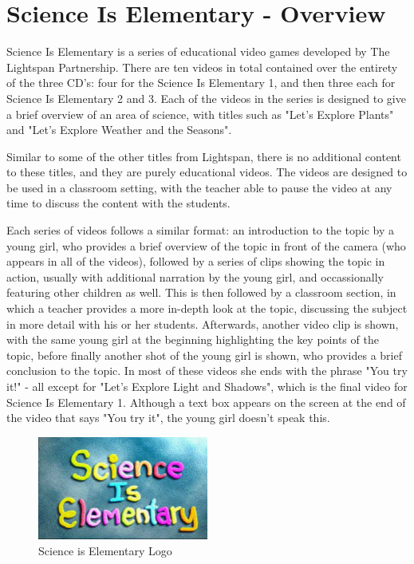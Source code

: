\chapter{Science Is Elementary - Overview}

Science Is Elementary is a series of educational video games developed by The Lightspan Partnership. There are ten videos in total contained over the entirety of the three CD's: four for the Science Is Elementary 1, and then three each for Science Is Elementary 2 and 3. Each of the videos in the series is designed to give a brief overview of an area of science, with titles such as "Let's Explore Plants" and "Let's Explore Weather and the Seasons".

Similar to some of the other titles from Lightspan, there is no additional content to these titles, and they are purely educational videos. The videos are designed to be used in a classroom setting, with the teacher able to pause the video at any time to discuss the content with the students.

Each series of videos follows a similar format: an introduction to the topic by a young girl, who provides a brief overview of the topic in front of the camera (who appears in all of the videos), followed by a series of clips showing the topic in action, usually with additional narration by the young girl, and occassionally featuring other children as well. This is then followed by a classroom section, in which a teacher provides a more in-depth look at the topic, discussing the subject in more detail with his or her students. Afterwards, another video clip is shown, with the same young girl at the beginning highlighting the key points of the topic, before finally another shot of the young girl is shown, who provides a brief conclusion to the topic. In most of these videos she ends with the phrase "You try it!" - all except for "Let's Explore Light and Shadows", which is the final video for Science Is Elementary 1. Although a text box appears on the screen at the end of the video that says "You try it", the young girl doesn't speak this.

\begin{figure}[H]
    \centering
    \includegraphics[width=0.5\textwidth]{./Games/ScienceIsElementary/Images/ScienceIsElementaryLogo.png}
    \caption{Science is Elementary Logo}
\end{figure}

